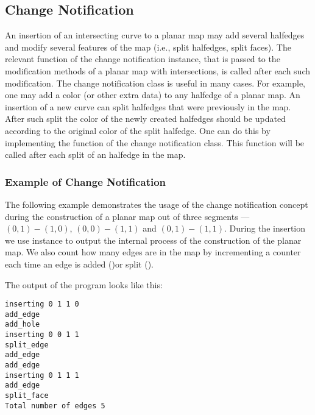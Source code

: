 \begin{ccAdvanced}
\subsection*{Change Notification}
An insertion of an intersecting curve to a planar map may add
several halfedges and modify several features of the map (i.e.,
split halfedges, split faces). The relevant function of the change
notification instance, that is passed to the modification methods
of a planar map with intersections, is called after each such
modification. The change notification class is useful in many
cases. For example, one may add a color (or other extra data) to
any halfedge of a planar map. An insertion of a new curve can
split halfedges that were previously in the map. After such split
the color of the newly created halfedges should be updated
according to the original color of the split halfedge. One can do
this by implementing the  function of the change
notification class. This function will be called after each split
of an halfedge in the map.


\subsubsection{Example of Change Notification}
\label{ssec:example2}
The following example demonstrates the usage of the change
notification concept during the construction of a
planar map out of three segments --- $(0,1)-(1,0)$, $(0,0)-(1,1)$
and $(0,1)-(1,1)$.
During the insertion we use  instance to
output the internal process of the construction of the planar map.
We also count how many edges are in the map by incrementing a
counter each time an edge is added ()or
split ().


The output of the program looks like this:
\begin{verbatim}
inserting 0 1 1 0
add_edge
add_hole
inserting 0 0 1 1
split_edge
add_edge
add_edge
inserting 0 1 1 1
add_edge
split_face
Total number of edges 5
\end{verbatim}

\end{ccAdvanced}



